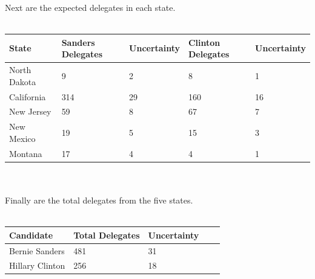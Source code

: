 \documentclass[12pt]{extarticle}
\begin{document}
Next are the expected delegates in each state.
\\
\\
\begin{centering}
	\begin{tabular}{|l|l|l|l|l|}
	  \hline
  State & Sanders Delegates & Uncertainty & Clinton Delegates & Uncertainty \\
	  \hline
	  \hline
  North Dakota & 9 & 2 & 8 & 1 \\
  California & 314 & 29 & 160 & 16 \\
     New Jersey & 59 & 8 & 67 & 7 \\
     New Mexico & 19 & 5 & 15 & 3 \\
     Montana & 17 & 4 & 4 & 1 \\
	  \hline
  \end{tabular}
\end{centering}
\\
\\
Finally are the total delegates from the five states.
\\
\\
\begin{centering}
	\begin{tabular}{|l|l|l|l|l|}
	  \hline
	  Candidate & Total Delegates & Uncertainty \\
	  \hline
	  \hline
	  Bernie Sanders & 481 & 31 \\
	  \hline
	  Hillary Clinton & 256 & 18 \\
	  \hline
  \end{tabular}
\end{centering}
\\
\\
\end{document}
